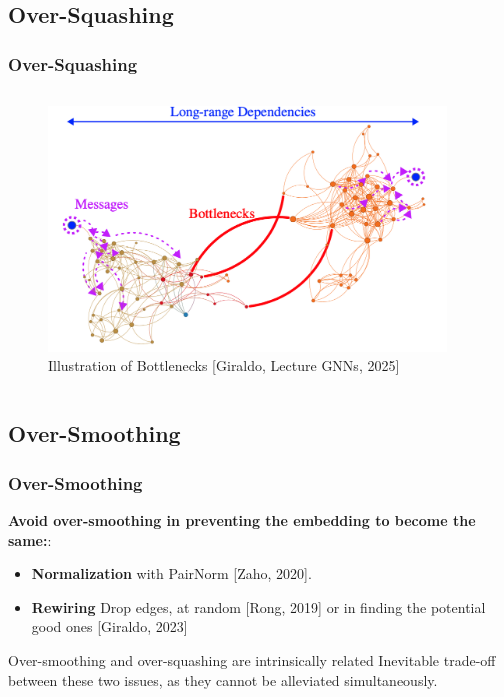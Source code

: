 \documentclass[10pt, aspectratio = 169]{beamer}
\begin{document}
\subsection{Over-Squashing}
\begin{frame}
    \frametitle{Over-Squashing}
    
    \begin{columns}
        \begin{column}{0.4\textwidth}
            \begin{figure}
                \includegraphics[width=0.99\textwidth]{figures/over_squashing_Girarldo.png}
                \caption{Illustration of Bottlenecks [Giraldo, Lecture GNNs, 2025]}
            \end{figure}

        \end{column}    

        
        \begin{column}{0.4\textwidth}

        \end{column}
    \end{columns}

  

\end{frame}

\subsection{Over-Smoothing}
\begin{frame}
    \frametitle{Over-Smoothing}
    \textbf{Avoid over-smoothing in preventing the embedding to become the same:}:
    \begin{itemize}
        \item \textbf{Normalization} with PairNorm [Zaho, 2020]\cite{zhao2020pairnorm}.
        \item \textbf{Rewiring} Drop edges, at random [Rong, 2019]\cite{rong2019dropedge} 
              or in finding the potential good ones [Giraldo, 2023]\cite{Giraldo_2023}
    \end{itemize}

    \begin{alertblock}{Over-smoothing and over-squashing are intrinsically related}
        Inevitable trade-off between these two issues, as they cannot be alleviated simultaneously.
    \end{alertblock}

\end{frame}
\end{document}
